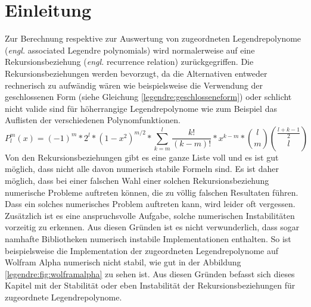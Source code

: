 %
%
%
\section{Einleitung\label{legendre:section:einleitung}}
Zur Berechnung respektive zur Auswertung von zugeordneten Legendrepolynome (\textit{engl.} associated Legendre polynomials) wird normalerweise auf eine Rekursionsbeziehung (\textit{engl.} recurrence relation) zurückgegriffen.
Die Rekursionsbeziehungen werden bevorzugt, da die Alternativen entweder rechnerisch zu aufwändig wären wie beispielsweise die Verwendung der geschlossenen Form (siehe Gleichung \eqref{legendre:geschlosseneform}) oder schlicht nicht valide sind für höherrangige Legendrepolynome wie zum Beispiel das Auflisten der verschiedenen Polynomfunktionen.
\begin{equation}
P^{m}_{l}(x)
=
(-1)^m*2^l*(1-x^2)^{m/2}
* \sum_{k=m}^{l} \frac{k!}{(k-m)!}*x^{k-m}
* \binom{l}{m} \binom{\frac{l+k-1}{2}}{l}
\label{legendre:geschlosseneform}
\end{equation}
Von den Rekursionsbeziehungen gibt es eine ganze Liste voll und es ist gut möglich, dass nicht alle davon numerisch stabile Formeln sind.
Es ist daher möglich, dass bei einer falschen Wahl einer solchen Rekursionsbeziehung numerische Probleme auftreten können, die zu völlig falschen Resultaten führen.
Dass ein solches numerisches Problem auftreten kann, wird leider oft vergessen.
Zusätzlich ist es eine anspruchsvolle Aufgabe, solche numerischen Instabilitäten vorzeitig zu erkennen.
Aus diesen Gründen ist es nicht verwunderlich, dass sogar namhafte Bibliotheken numerisch instabile Implementationen enthalten.
So ist beispielsweise die Implementation der zugeordneten Legendrepolynome auf Wolfram Alpha \cite{legendre:wolfram-alpha} numerisch nicht stabil, wie gut in der Abbildung \ref{legendre:fig:wolframalpha} zu sehen ist.
Aus diesen Gründen befasst sich dieses Kapitel mit der Stabilität oder eben Instabilität der Rekursionsbeziehungen für zugeordnete Legendrepolynome.

